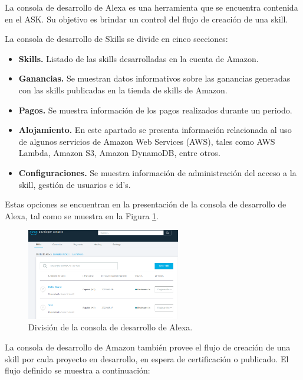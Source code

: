La consola de desarrollo de Alexa es una herramienta que se encuentra contenida en el ASK. Su objetivo es brindar un control del flujo de creación de una skill.

La consola de desarrollo de Skills se divide en cinco secciones:

\begin{itemize}
  \item \textbf{Skills.} Listado de las skills desarrolladas en la cuenta de Amazon.
  \item \textbf{Ganancias.} Se muestran datos informativos sobre las ganancias generadas con las skills publicadas en la tienda de skills de Amazon.
  \item \textbf{Pagos.} Se muestra información de los pagos realizados durante un periodo.
  \item \textbf{Alojamiento.} En este apartado se presenta información relacionada al uso de algunos servicios de Amazon Web Services (AWS), tales como AWS Lambda, Amazon S3, Amazon DynamoDB, entre otros.
  \item \textbf{Configuraciones.} Se muestra información de administración del acceso a la skill, gestión de usuarios e id's.
\end{itemize}

Estas opciones se encuentran en la presentación de la consola de desarrollo de Alexa, tal como se muestra en la Figura \ref{fig:43}.

\begin{figure}[H]
  \centering
  \includegraphics[width=0.60\textwidth]{Cap4/Figuras/Consola de Desarrollo de Alexa.png}
  \caption{División de la consola de desarrollo de Alexa.}
  \label{fig:43}
\end{figure}

La consola de desarrollo de Amazon también provee el flujo de creación de una skill por cada proyecto en desarrollo, en espera de certificación o publicado. El flujo definido se muestra a continuación:

